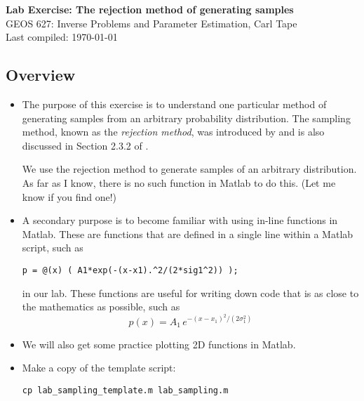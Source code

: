 \documentclass[11pt,titlepage,fleqn]{article}
\begin{document}

\begin{spacing}{1.2}
\centering
{\large \bf Lab Exercise: The rejection method of generating samples} \\
GEOS 627: Inverse Problems and Parameter Estimation, Carl Tape \\
Last compiled: \today
\end{spacing}


\subsection*{Overview}

\begin{itemize}
\item The purpose of this exercise is to understand one particular method of generating samples from an arbitrary probability distribution. The sampling method, known as the {\em rejection method}, was introduced by \citet{vonNeumann1951} and is also discussed in Section 2.3.2 of \citet{Tarantola2005}.

We use the rejection method to generate samples of an arbitrary distribution. As far as I know, there is no such function in Matlab to do this. (Let me know if you find one!)

\item A secondary purpose is to become familiar with using in-line functions in Matlab. These are functions that are defined in a single line within a Matlab script, such as

\verb+p = @(x) ( A1*exp(-(x-x1).^2/(2*sig1^2)) );+

in our lab. These functions are useful for writing down code that is as close to the mathematics as possible, such as
%
\begin{equation}
p(x) = A_1\,e^{-(x-x_1)^2/(2\sigma_1^2)}
\end{equation}

\item We will also get some practice plotting 2D functions in Matlab.

\item Make a copy of the template script:
%
\begin{verbatim}
cp lab_sampling_template.m lab_sampling.m
\end{verbatim}

\end{itemize}
\end{document}
